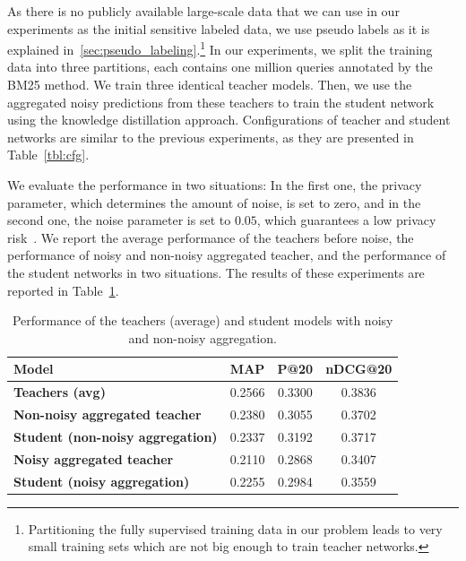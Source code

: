 As there is no publicly available large-scale data that we can use in our experiments as the initial sensitive labeled data, we use pseudo labels as it is explained in~\ref{sec:pseudo_labeling}.\footnote{Partitioning the fully supervised training data in our problem leads to very small training sets which are not big enough to train teacher networks.}
In our experiments, we split the training data into three partitions, each contains one million queries annotated by the BM25 method. We train three identical teacher models. Then, we use the aggregated noisy predictions from these teachers to train the student network using the knowledge distillation approach. Configurations of teacher and student networks are similar to the previous experiments, as they are presented in Table~\ref{tbl:cfg}.

We evaluate the performance in two situations: In the first one, the privacy parameter, which determines the amount of noise, is set to zero, and in the second one, the noise parameter is set to $0.05$, which guarantees a low privacy risk~\citep{Papernot:2017}.
%
We report the average performance of the teachers before noise, the performance of noisy and non-noisy aggregated teacher, and the performance of the student networks in two situations.  The results of these experiments are reported in Table~\ref{tbl_res2}.

\begin{table}[t]
\centering
\caption{\label{tbl_res2}Performance of the teachers (average) and student models with noisy and non-noisy aggregation.}
\vspace{5pt}
\begin{adjustbox}{max width=\textwidth}
\begin{tabular}{l c c c}
\toprule
 \textbf{Model} & \textbf{MAP} & \textbf{P@20} & \textbf{nDCG@20} 
\\ \midrule
{\textbf{Teachers (avg)}}
& 0.2566 & 0.3300 & 0.3836
\\ \midrule
\textbf{Non-noisy aggregated teacher} 
& 0.2380 & 0.3055 & 0.3702 
\\
\textbf{Student \small{(non-noisy aggregation)}} 
& 0.2337 & 0.3192 & 0.3717
\\ \midrule 
\textbf{Noisy aggregated teacher} 
& 0.2110 & 0.2868 & 0.3407 
\\
\textbf{Student \small{(noisy aggregation)}} 
& 0.2255 & 0.2984 & 0.3559 
\\ \bottomrule
\end{tabular}
\end{adjustbox}
\end{table}


